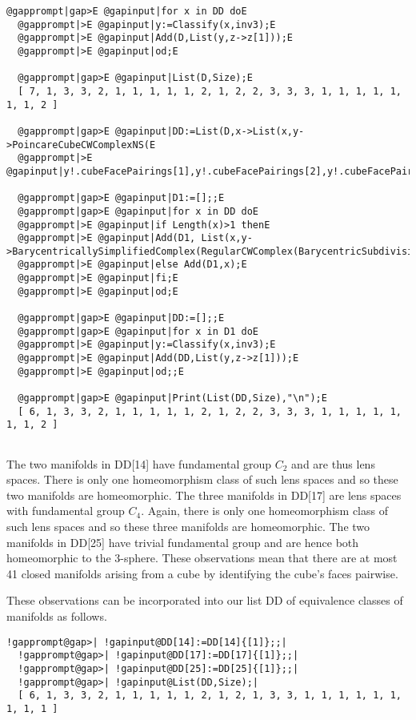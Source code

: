 \documentclass[a4paper,11pt]{report}
\begin{document}
{{\begin{Verbatim}[commandchars=@|E,fontsize=\small,frame=single,label=Example]
  @gapprompt|gap>E @gapinput|for x in DD doE
  @gapprompt|>E @gapinput|y:=Classify(x,inv3);E
  @gapprompt|>E @gapinput|Add(D,List(y,z->z[1]));E
  @gapprompt|>E @gapinput|od;E
  
  @gapprompt|gap>E @gapinput|List(D,Size);E
  [ 7, 1, 3, 3, 2, 1, 1, 1, 1, 1, 2, 1, 2, 2, 3, 3, 3, 1, 1, 1, 1, 1, 1, 1, 2 ]
  
  @gapprompt|gap>E @gapinput|DD:=List(D,x->List(x,y->PoincareCubeCWComplexNS(E
  @gapprompt|>E @gapinput|y!.cubeFacePairings[1],y!.cubeFacePairings[2],y!.cubeFacePairings[3])));;E
  
  @gapprompt|gap>E @gapinput|D1:=[];;E
  @gapprompt|gap>E @gapinput|for x in DD doE
  @gapprompt|>E @gapinput|if Length(x)>1 thenE
  @gapprompt|>E @gapinput|Add(D1, List(x,y->BarycentricallySimplifiedComplex(RegularCWComplex(BarycentricSubdivision(y)))));E
  @gapprompt|>E @gapinput|else Add(D1,x);E
  @gapprompt|>E @gapinput|fi;E
  @gapprompt|>E @gapinput|od;E
  
  @gapprompt|gap>E @gapinput|DD:=[];;E
  @gapprompt|gap>E @gapinput|for x in D1 doE
  @gapprompt|>E @gapinput|y:=Classify(x,inv3);E
  @gapprompt|>E @gapinput|Add(DD,List(y,z->z[1]));E
  @gapprompt|>E @gapinput|od;;E
  
  @gapprompt|gap>E @gapinput|Print(List(DD,Size),"\n");E
  [ 6, 1, 3, 3, 2, 1, 1, 1, 1, 1, 2, 1, 2, 2, 3, 3, 3, 1, 1, 1, 1, 1, 1, 1, 2 ]
  
\end{Verbatim}
 

The two manifolds in DD[14] have fundamental group $C_2$ and are thus lens spaces. There is only one homeomorphism class of such lens
spaces and so these two manifolds are homeomorphic. The three manifolds in
DD[17] are lens spaces with fundamental group $C_4$. Again, there is only one homeomorphism class of such lens spaces and so
these three manifolds are homeomorphic. The two manifolds in DD[25] have
trivial fundamental group and are hence both homeomorphic to the 3-sphere.
These observations mean that there are at most 41 closed manifolds arising
from a cube by identifying the cube's faces pairwise. 

 These observations can be incorporated into our list DD of equivalence classes
of manifolds as follows. 
\begin{Verbatim}[commandchars=!@|,fontsize=\small,frame=single,label=Example]
  !gapprompt@gap>| !gapinput@DD[14]:=DD[14]{[1]};;|
  !gapprompt@gap>| !gapinput@DD[17]:=DD[17]{[1]};;|
  !gapprompt@gap>| !gapinput@DD[25]:=DD[25]{[1]};;|
  !gapprompt@gap>| !gapinput@List(DD,Size);|
  [ 6, 1, 3, 3, 2, 1, 1, 1, 1, 1, 2, 1, 2, 1, 3, 3, 1, 1, 1, 1, 1, 1, 1, 1, 1 ]
  

\end{Verbatim}}}
\end{document}
